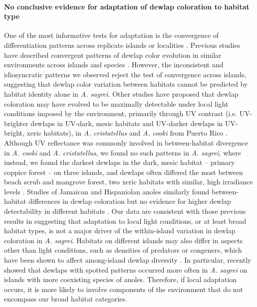 \paragraph{No conclusive evidence for adaptation of dewlap coloration to habitat type} One of the most informative tests for adaptation is the convergence of differentiation patterns across replicate islands or localities \citep{Losos2009, Losos2011}. Previous studies have described convergent patterns of dewlap color evolution in similar environments across islands and species \citep{Thorpe2002a, Thorpe2002b}. However, the inconsistent and idiosyncratic patterns we observed reject the test of convergence across islands, suggesting that dewlap color variation between habitats cannot be predicted by habitat identity alone in \textit{A. sagrei}. Other studies have proposed that dewlap coloration may have evolved to be maximally detectable under local light conditions imposed by the environment, primarily through UV contrast (i.e. UV-brighter dewlaps in UV-dark, mesic habitats and UV-darker dewlaps in UV-bright, xeric habitats), in \textit{A. cristatellus} and \textit{A. cooki} from Puerto Rico \citep{Leal2002, Leal2004}. Although UV reflectance was commonly involved in between-habitat divergence in \textit{A. cooki} and \textit{A. cristatellus}, we found no such patterns in \textit{A. sagrei}, where instead, we found the darkest dewlaps in the dark, mesic habitat -- primary coppice forest -- on three islands, and dewlaps often differed the most between beach scrub and mangrove forest, two xeric habitats with similar, high irradiance levels \citep{Howard1950, Schoener1968}. Studies of Jamaican and Hispaniolan anoles similarly found between-habitat differences in dewlap coloration but no evidence for higher dewlap detectability in different habitats \citep{Fleishman2009, Ng2012}. Our data are consistent with those previous results in suggesting that adaptation to local light conditions, or at least broad habitat types, is not a major driver of the within-island variation in dewlap coloration in \textit{A. sagrei}. Habitats on different islands may also differ in aspects other than light conditions, such as densities of predators or congeners, which have been shown to affect among-island dewlap diversity \citep{Vanhooydonck2009, Baeckens2018}. In particular, \citet{Baeckens2018} recently showed that dewlaps with spotted patterns occurred more often in \textit{A. sagrei} on islands with more coexisting species of anoles. Therefore, if local adaptation occurs, it is more likely to involve components of the environment that do not encompass our broad habitat categories.

